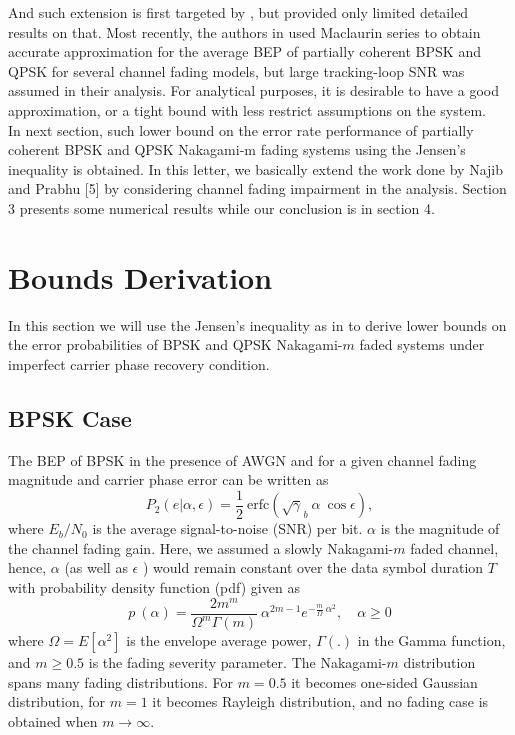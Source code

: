 And such extension is first targeted by \cite{weber:76}, but
provided only limited detailed results on that. Most recently, the
authors in \cite{simon:mar01} used Maclaurin series to obtain
accurate approximation for the average BEP of partially coherent
BPSK and QPSK for several channel fading models, but large
tracking-loop SNR was assumed in their analysis. For analytical
purposes, it is desirable to have a good approximation, or a tight
bound with less restrict
assumptions on the system.\\

In next section, such lower bound on the error rate performance of
partially coherent BPSK and QPSK Nakagami-m fading systems using
the Jensen's inequality is obtained. In this letter, we basically
extend the work done by Najib and Prabhu [5] by considering
channel fading impairment in the analysis. Section 3 presents
some numerical results while our conclusion is in section 4.\\
\section{ Bounds Derivation}
In this section we will use the Jensen's inequality as in
\cite{najib:98} to derive lower bounds on the error probabilities
of BPSK and QPSK Nakagami-$m$ faded systems under imperfect
carrier phase recovery condition.

\subsection{BPSK Case}
The BEP of BPSK in the presence of AWGN and for a given channel
fading magnitude  and carrier phase error   can be written as
\cite{prabhu:mar76}
\begin{equation}
\label{upper:1}
P_2(e|\alpha,\epsilon)=\frac{1}{2}~\mbox{erfc}\left(\sqrt\gamma_b~
\alpha~\cos\epsilon\right),
\end{equation}
where $E_b/N_0$ is the average signal-to-noise (SNR) per bit.
$\alpha$ is the magnitude of the channel fading gain. Here, we
assumed a slowly Nakagami-$m$ faded channel, hence, $\alpha$ (as
well as $\epsilon$ ) would remain constant over the data symbol
duration $T$ with probability density function (pdf) given as
\begin{equation}
\label{upper:2}
p~(\alpha)=\frac{2m^m}{\Omega^m\Gamma(m)}~\alpha^{2m-1}e^{-\frac{m}{\Omega}~\alpha^2},
\quad \alpha \ge 0
\end{equation}
where $\Omega=E[\alpha^2]$  is the envelope average power,
$\Gamma(.)$ in the Gamma function, and $m\ge0.5$ is the fading
severity parameter. The Nakagami-$m$ distribution spans many
fading distributions. For $m=0.5$  it becomes one-sided Gaussian
distribution, for $m=1$ it becomes Rayleigh distribution, and no
fading case is obtained when $m\rightarrow\infty$.\\

